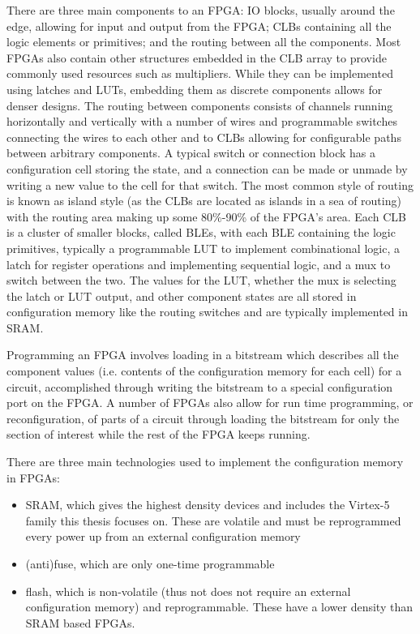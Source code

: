 \documentclass[12pt,final,oneside]{dwThesis} %
\begin{document}
   There are three main components to an \gls{FPGA}: \gls{IO} blocks, usually
   around the edge, allowing for input and output from the \gls{FPGA};
   \glspl{CLB} containing all the logic elements or \glspl{primitive}; and the
   routing between all the components.  Most \glspl{FPGA} also contain other
   structures embedded in the \gls{CLB} array to provide commonly used
   resources such as multipliers. While they can be implemented using latches
   and \glspl{LUT}, embedding them as discrete components allows for denser
   designs.  The routing between components consists of channels running
   horizontally and vertically with a number of wires and programmable switches
   connecting the wires to each other and to \glspl{CLB} allowing for
   configurable paths between arbitrary components. A typical switch or
   connection block has a configuration cell storing the state, and a
   connection can be made or unmade by writing a new value to the cell for that
   switch. The most common style of routing is known as island style (as the
   \glspl{CLB} are located as islands in a sea of routing) with the routing
   area making up some 80\%-90\% of the \gls{FPGA}'s area\cite{FPGAArch}.  Each
   \gls{CLB} is a cluster of smaller blocks, called \glspl{BLE}, with each
   \gls{BLE} containing the logic primitives, typically a programmable
   \gls{LUT} to implement combinational logic, a latch for register operations
   and implementing sequential logic, and a \gls{mux} to switch between the
   two. The values for the \gls{LUT}, whether the \gls{mux} is selecting the
   latch or \gls{LUT} output, and other component states are all stored in
   configuration memory like the routing switches and are typically implemented
   in \gls{SRAM}.

   Programming an \gls{FPGA} involves loading in a bitstream which describes
   all the component values (i.e. contents of the configuration memory for each
   cell) for a circuit, accomplished through writing the bitstream to a special
   configuration port on the \gls{FPGA}. A number of \glspl{FPGA} also allow
   for run time programming, or reconfiguration, of parts of a circuit through
   loading the bitstream for only the section of interest while the rest of the
   \gls{FPGA} keeps running.

    There are three main
   technologies used to implement the configuration memory in \glspl{FPGA}:

   \begin{itemize}

      \item \gls{SRAM}, which gives the highest density devices and includes
         the Virtex-5 family this thesis focuses on. These are volatile and
         must be reprogrammed every power up from an external configuration
         memory
      \item (anti)fuse, which are only one-time programmable
      \item flash, which is non-volatile (thus not does not require an external
         configuration memory) and reprogrammable. These have a lower
         density than \gls{SRAM} based \glspl{FPGA}\cite{FPGAArch}.

   \end{itemize}
\end{document}
